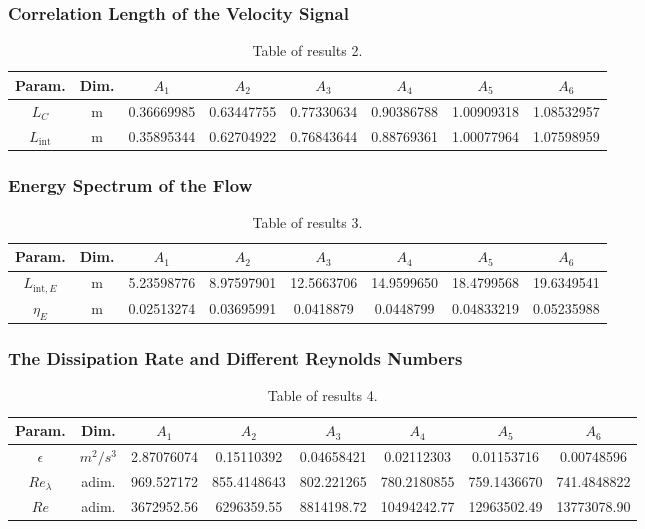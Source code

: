 \documentclass[11pt,titlepage]{article}
\begin{document}
\subsubsection{Correlation Length of the Velocity Signal}
\begin{table}[h]
\centering
\caption{Table of results 2.}
    \begin{tabular}{ | c | c | c | c | c | c | c | c |}
    \hline
    Param. & Dim. & $A_1$ & $A_2$ & $A_3$ & $A_4$ & $A_5$ & $A_6$ \\
    \hline
    $L_C$ &m&0.36669985 &0.63447755& 0.77330634 &0.90386788& 1.00909318 &1.08532957  \\
    \hline
    $L_\mathrm{int}$ & m&0.35895344& 0.62704922& 0.76843644& 0.88769361 &1.00077964 &1.07598959 \\
    \hline
    \end{tabular}
\end{table}

\subsubsection{Energy Spectrum of the Flow}
\begin{table}[h]
\centering
\caption{Table of results 3.}
    \begin{tabular}{ | c | c | c | c | c | c | c | c |}
    \hline
    Param. & Dim. & $A_1$ & $A_2$ & $A_3$ & $A_4$ & $A_5$ & $A_6$ \\
    \hline
    $L_{\mathrm{int},E}$ &m &5.23598776& 8.97597901 &12.5663706 & 14.9599650& 18.4799568& 19.6349541 \\
    \hline
    $\eta_E$&m & 0.02513274& 0.03695991& 0.0418879 & 0.0448799&  0.04833219& 0.05235988 \\
    \hline
    \end{tabular}
\end{table}

\subsubsection{The Dissipation Rate and Different Reynolds Numbers}
\begin{table}[h!]
\centering
\caption{Table of results 4.}
    \begin{tabular}{ | c | c | c | c | c | c | c | c |}
        \hline
        Param. & Dim. & $A_1$ & $A_2$ & $A_3$ & $A_4$ & $A_5$ & $A_6$ \\
        \hline
        $\epsilon$ & $m^2/s^3$ &2.87076074& 0.15110392& 0.04658421& 0.02112303& 0.01153716& 0.00748596 \\
        \hline
        $Re_\lambda$ &adim.&969.527172&  855.4148643& 802.221265  &780.2180855& 759.1436670&
        741.4848822 \\
        \hline
        $Re$  &adim. &3672952.56  &6296359.55 & 8814198.72 &10494242.77&
        12963502.49 &13773078.90\\
        \hline
    \end{tabular}
\end{table}
\end{document}
